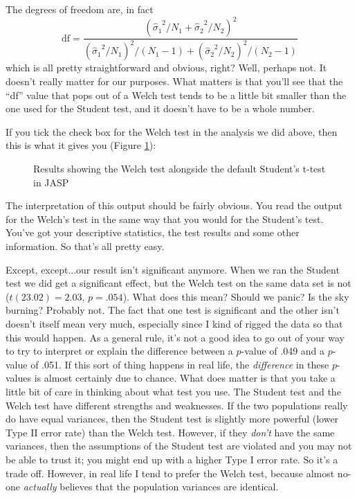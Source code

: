 \vspace{0.5cm}
\begin{mdframed}[style=MyFrame,nobreak=true]
The degrees of freedom are, in fact
$$
\mbox{df} = \frac{ ({\hat{\sigma}_1}^2 / N_1 + {\hat{\sigma}_2}^2 / N_2)^2 }{  ({\hat{\sigma}_1}^2 / N_1)^2 / (N_1 -1 )  + ({\hat{\sigma}_2}^2 / N_2)^2 / (N_2 -1 ) } 
$$
which is all pretty straightforward and obvious, right? Well, perhaps not. It doesn't really matter for our purposes. What matters is that you'll see that the ``df'' value that pops out of a Welch test tends to be a little bit smaller than the one used for the Student test, and it doesn't have to be a whole number. 
\end{mdframed}


If you tick the check box for the Welch test in the analysis we did above, then this is what it gives you (Figure \ref{fig:ttest_welch}):

\begin{figure}[htb]
\begin{center}
\caption{Results showing the Welch test alongside the default Student's t-test in JASP}
\HR
\label{fig:ttest_welch}
\end{center}
\end{figure}

The interpretation of this output should be fairly obvious. You read the output for the Welch's test in the same way that you would for the Student's test. You've got your descriptive statistics, the test results and some other information. So that's all pretty easy. 

Except, except...our result isn't significant anymore. When we ran the Student test we did get a significant effect, but the Welch test on the same data set is not ($t(23.02) = 2.03$, $p = .054$). What does this mean? Should we panic? Is the sky burning? Probably not. The fact that one test is significant and the other isn't doesn't itself mean very much, especially since I kind of rigged the data so that this would happen. As a general rule, it's not a good idea to go out of your way to try to interpret or explain the difference between a $p$-value of .049 and a $p$-value of .051. If this sort of thing happens in real life, the {\it difference} in these $p$-values is almost certainly due to chance. What does matter is that you take a little bit of care in thinking about what test you use. The Student test and the Welch test have different strengths and weaknesses. If the two populations really do have equal variances, then the Student test is slightly more powerful (lower Type II error rate) than the Welch test. However, if they {\it don't} have the same variances, then the assumptions of the Student test are violated and you may not be able to trust it; you might end up with a higher Type I error rate. So it's a trade off. However, in real life I tend to prefer the Welch test, because almost no-one {\it actually} believes that the population variances are identical.

